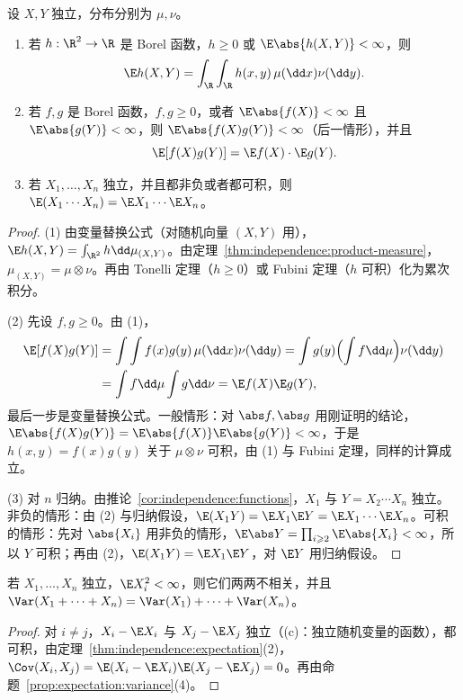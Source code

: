 \begin{theorem}[独立随机变量的期望]\label{thm:independence:expectation}
设 $X,Y$ 独立，分布分别为 $\mu,\nu$。
\begin{enumerate}
\item 若 $h:\R^2\to\R$ 是 Borel 函数，$h\geqslant0$ 或 $\E\abs{h(X,Y)}<\infty$，则
\[
\E h(X,Y)=\int_\R\int_\R h(x,y)\,\mu(\dd x)\nu(\dd y).
\]
\item 若 $f,g$ 是 Borel 函数，$f,g\geqslant0$，或者 $\E\abs{f(X)}<\infty$ 且 $\E\abs{g(Y)}<\infty$，则 $\E\abs{f(X)g(Y)}<\infty$（后一情形），并且
\[
\E[f(X)g(Y)]=\E f(X)\cdot \E g(Y).
\]
\item 若 $X_1,\dots,X_n$ 独立，并且都非负或者都可积，则 $\E(X_1\cdots X_n)=\E X_1\cdots \E X_n$。
\end{enumerate}
\end{theorem}
\begin{proof}
(1) 由变量替换公式（对随机向量 $(X,Y)$ 用），$\E h(X,Y)=\int_{\R^2}h\dd\mu_{(X,Y)}$。由定理~\ref{thm:independence:product-measure}，$\mu_{(X,Y)}=\mu\otimes\nu$。再由 Tonelli 定理（$h\geqslant0$）或 Fubini 定理（$h$ 可积）化为累次积分。

(2) 先设 $f,g\geqslant0$。由 (1)，
\[
\begin{aligned}
\E[f(X)g(Y)]&=\int\int f(x)g(y)\,\mu(\dd x)\nu(\dd y)=\int g(y)\Bigl(\int f\dd\mu\Bigr)\nu(\dd y)\\
&=\int f\dd\mu\int g\dd\nu=\E f(X)\E g(Y),
\end{aligned}
\]
最后一步是变量替换公式。一般情形：对 $\abs f,\abs g$ 用刚证明的结论，$\E\abs{f(X)g(Y)}=\E\abs{f(X)}\E\abs{g(Y)}<\infty$，于是 $h(x,y)=f(x)g(y)$ 关于 $\mu\otimes\nu$ 可积，由 (1) 与 Fubini 定理，同样的计算成立。

(3) 对 $n$ 归纳。由推论~\ref{cor:independence:functions}，$X_1$ 与 $Y=X_2\cdots X_n$ 独立。非负的情形：由 (2) 与归纳假设，$\E(X_1Y)=\E X_1\E Y=\E X_1\cdots \E X_n$。可积的情形：先对 $\abs{X_i}$ 用非负的情形，$\E\abs Y=\prod_{i\geqslant2}\E\abs{X_i}<\infty$，所以 $Y$ 可积；再由 (2)，$\E(X_1Y)=\E X_1\E Y$，对 $\E Y$ 用归纳假设。
\end{proof}

\begin{corollary}[独立和的方差]\label{cor:independence:variance}
若 $X_1,\dots,X_n$ 独立，$\E X_i^2<\infty$，则它们两两不相关，并且 $\Var(X_1+\cdots+X_n)=\Var(X_1)+\cdots+\Var(X_n)$。
\end{corollary}
\begin{proof}
对 $i\neq j$，$X_i-\E X_i$ 与 $X_j-\E X_j$ 独立（(c)：独立随机变量的函数），都可积，由定理~\ref{thm:independence:expectation}(2)，$\Cov(X_i,X_j)=\E(X_i-\E X_i)\E(X_j-\E X_j)=0$。再由命题~\ref{prop:expectation:variance}(4)。
\end{proof}

